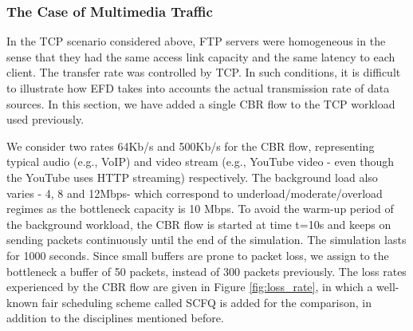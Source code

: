 \documentclass[preprint,12pt]{elsarticle}
\begin{document}




\subsubsection{The Case of Multimedia Traffic}\label{sec:multi_media}
In the TCP scenario considered above, FTP servers were homogeneous in the sense that they had the same access link capacity and the same latency to each client. The transfer rate was controlled by TCP. In such conditions, it is difficult to illustrate how EFD takes into accounts the actual transmission rate of data sources. In this section, we have added a single CBR flow to the TCP workload used previously.%

We consider two  rates 64Kb/s and 500Kb/s for the CBR flow, representing typical audio (e.g., VoIP) and video stream (e.g., YouTube video - even though the YouTube uses HTTP streaming)  respectively. The background load also varies - 4, 8 and 12Mbps-  which correspond to underload/moderate/overload regimes as the bottleneck capacity is 10 Mbps. To avoid the warm-up period of the background workload, the CBR flow is started at time t=10s and keeps on sending packets continuously until the end of the simulation. The simulation lasts for 1000 seconds. Since small buffers are prone to packet loss, we assign to the bottleneck a buffer of 50 packets, instead of 300 packets previously. The loss rates experienced by the CBR flow are given in Figure \ref{fig:loss_rate}, in which a well-known fair scheduling scheme called SCFQ \cite{Golestani94SCFQ} is added for the comparison, in addition to the disciplines mentioned before.
\end{document}
